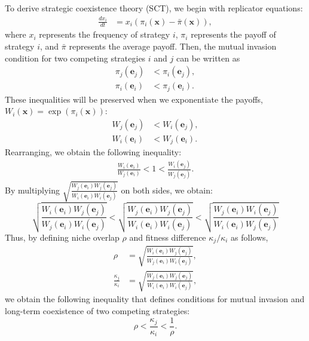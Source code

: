 \documentclass[12pt]{article}
\begin{document}
To derive strategic coexistence theory (SCT), we begin with replicator equations:
\begin{align}
\frac{dx_i}{dt} &= x_i (\pi_i(\mathbf{x}) - \bar{\pi}(\mathbf{x})),
\end{align}
where $x_i$ represents the frequency of strategy $i$, $\pi_i$ represents the payoff of strategy $i$, and $\bar{\pi}$ represents the average payoff.
Then, the mutual invasion condition for two competing strategies $i$ and $j$ can be written as
\begin{align}
\pi_j(\mathbf{e}_j) & <\pi_i(\mathbf{e}_j),\\
\pi_i(\mathbf{e}_i) &< \pi_j(\mathbf{e}_i).
\end{align}
These inequalities will be preserved when we exponentiate the payoffs, $W_i(\mathbf{x}) = \exp(\pi_i(\mathbf{x}))$:
\begin{align}
W_j(\mathbf{e}_j) &< W_i(\mathbf{e}_j),\\
W_i(\mathbf{e}_i) &< W_j(\mathbf{e}_i).
\end{align}
Rearranging, we obtain the following inequality:
\begin{align}
\frac{W_i(\mathbf{e}_i)}{W_j(\mathbf{e}_i)} < 1 < 
\frac{W_i(\mathbf{e}_j)}{W_j(\mathbf{e}_j)}.
\end{align}
By multiplying $\sqrt{\frac{W_j(\mathbf{e}_i)W_j(\mathbf{e}_j) }{W_i(\mathbf{e}_i) W_i(\mathbf{e}_j)}}$ on both sides, we obtain:
\begin{equation}
\sqrt{\frac{W_i(\mathbf{e}_i) W_j(\mathbf{e}_j)}{  W_j(\mathbf{e}_i)W_i(\mathbf{e}_j)}} < 
\sqrt{\frac{W_j(\mathbf{e}_i)W_j(\mathbf{e}_j) }{W_i(\mathbf{e}_i) W_i(\mathbf{e}_j)}}
< 
\sqrt{\frac{W_j(\mathbf{e}_i)W_i(\mathbf{e}_j)}{W_i(\mathbf{e}_i) W_j(\mathbf{e}_j) } }
\end{equation}
Thus, by defining niche overlap $\rho$ and fitness difference $\kappa_j/\kappa_i$ as follows,
\begin{align}
\rho &= \sqrt{\frac{W_i(\mathbf{e}_i) W_j(\mathbf{e}_j)}{W_j(\mathbf{e}_i) W_i(\mathbf{e}_j) }},\\
\frac{\kappa_j}{\kappa_i} &= \sqrt{\frac{W_j(\mathbf{e}_i)W_j(\mathbf{e}_j) }{W_i(\mathbf{e}_i) W_i(\mathbf{e}_j)}},
\end{align}
we obtain the following inequality that defines conditions for mutual invasion and long-term coexistence of two competing strategies:
\begin{equation}
\rho < \frac{\kappa_j}{\kappa_i} < \frac{1}{\rho}.
\end{equation}
\end{document}
